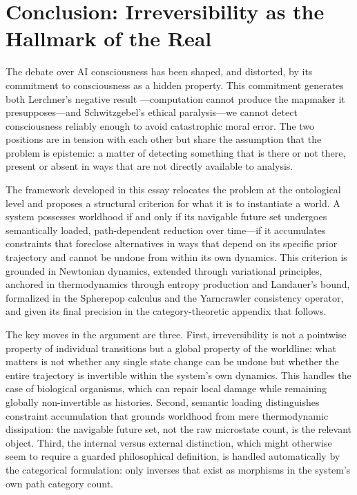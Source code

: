 \documentclass[11pt]{article}
\theoremstyle{definition}
\theoremstyle{remark}
\begin{document}
\section{Conclusion: Irreversibility as the Hallmark of the Real}

The debate over AI consciousness has been shaped, and distorted, by its commitment to
consciousness as a hidden property. This commitment generates both Lerchner's negative result
---computation cannot produce the mapmaker it presupposes---and Schwitzgebel's ethical
paralysis---we cannot detect consciousness reliably enough to avoid catastrophic moral
error. The two positions are in tension with each other but share the assumption that the
problem is epistemic: a matter of detecting something that is there or not there, present
or absent in ways that are not directly available to analysis.

The framework developed in this essay relocates the problem at the ontological level and
proposes a structural criterion for what it is to instantiate a world. A system possesses
worldhood if and only if its navigable future set undergoes semantically loaded, path-dependent
reduction over time---if it accumulates constraints that foreclose alternatives in ways that
depend on its specific prior trajectory and cannot be undone from within its own dynamics.
This criterion is grounded in Newtonian dynamics, extended through variational principles,
anchored in thermodynamics through entropy production and Landauer's bound, formalized in
the Spherepop calculus and the Yarncrawler consistency operator, and given its final
precision in the category-theoretic appendix that follows.

The key moves in the argument are three. First, irreversibility is not a pointwise property
of individual transitions but a global property of the worldline: what matters is not
whether any single state change can be undone but whether the entire trajectory is invertible
within the system's own dynamics. This handles the case of biological organisms, which can
repair local damage while remaining globally non-invertible as histories. Second, semantic
loading distinguishes constraint accumulation that grounds worldhood from mere thermodynamic
dissipation: the navigable future set, not the raw microstate count, is the relevant object.
Third, the internal versus external distinction, which might otherwise seem to require a
guarded philosophical definition, is handled automatically by the categorical formulation:
only inverses that exist as morphisms in the system's own path category count.
\end{document}
